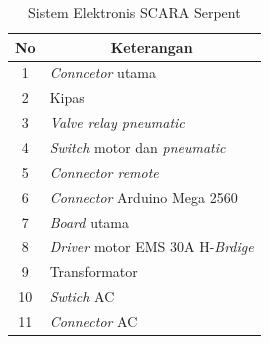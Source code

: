 \begin{longtable}{|c|l|}
	\caption{Sistem Elektronis SCARA Serpent}
	\label{tbl.elektronisSCARA Serpent}\\
	\hline
	\rowcolor[HTML]{9B9B9B} 
	No & \multicolumn{1}{c|}{\cellcolor[HTML]{9B9B9B}Keterangan} \\ \hline
	\endfirsthead
	\endhead
	1  & \textit{Conncetor} utama                                          \\ \hline
	2  & Kipas                                                     \\ \hline
	3  &\textit{Valve relay pneumatic}                                   \\ \hline
	4  &\textit{Switch} motor dan \textit{pneumatic}                              \\ \hline
	5  & \textit{Connector remote  }                                      \\ \hline
	6  & \textit{Connector} Arduino Mega 2560                             \\ \hline
	7  & \textit{Board} utama                                             \\ \hline
	8  & \textit{Driver} motor EMS 30A H-\textit{Brdige}                           \\ \hline
	9  & Transformator                                           \\ \hline
	10 & \textit{Swtich} AC                                               \\ \hline
	11 & \textit{Connector} AC                                            \\ \hline
\end{longtable}


